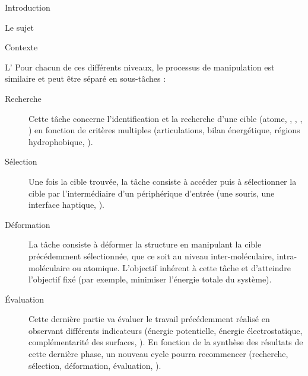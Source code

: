 \documentclass[myfrancais]{mythesis}
\begin{document}
\begin{mypart}{Introduction}
\begin{mychapter}{Le sujet}
\begin{mysection}{Contexte}
\begin{mysubsection}{L'}
					Pour chacun de ces différents niveaux, le processus de manipulation est similaire et peut être séparé en sous-tâches  :
					\begin{description}
						\item[Recherche] Cette tâche concerne l'identification et la recherche d'une cible (atome, , \myhelice*, \myfeuillet*, \myetc) en fonction de critères multiples (articulations, bilan énergétique, régions hydrophobique, \myetc).
						\item[Sélection] Une fois la cible trouvée, la tâche consiste à accéder puis à sélectionner la cible par l'intermédiaire d'un périphérique d'entrée (une souris, une interface haptique, \myetc).
						\item[Déformation] La tâche consiste à déformer la structure en manipulant la cible précédemment sélectionnée, que ce soit au niveau inter-moléculaire, intra-moléculaire ou atomique.
							L'objectif inhérent à cette tâche et d'atteindre l'objectif fixé (par exemple, minimiser l'énergie totale du système).
						\item[Évaluation] Cette dernière partie va évaluer le travail précédemment réalisé en observant différents indicateurs (énergie potentielle, énergie électrostatique, complémentarité des surfaces, \myetc).
							En fonction de la synthèse des résultats de cette dernière phase, un nouveau cycle pourra recommencer (recherche, sélection, déformation, évaluation, \myetc).
					\end{description}


\end{mysubsection}
\end{mysection}
\end{mychapter}
\end{mypart}
\end{document}
